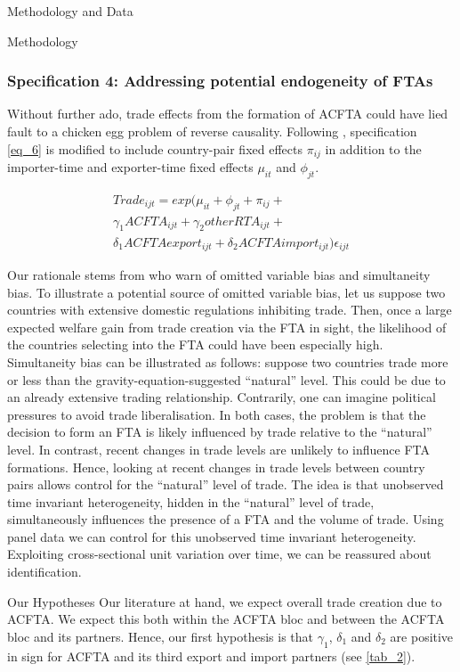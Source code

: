 \begin{section}{Methodology and Data }
\begin{subsection}{Methodology }
\subsubsection*{Specification 4: Addressing potential endogeneity of FTAs}

Without further ado, trade effects from the formation of ACFTA could have lied fault to a chicken egg problem of reverse causality. Following \cite{ypl_2016}, specification \ref{eq_6} is modified to include country-pair fixed effects $\pi_{ij}$ in addition to the importer-time and exporter-time fixed effects $\mu_{it}$ and $\phi_{jt}$.

\begin{multline}\label{eq_7}
Trade_{ijt} = exp \Big(\mu_{it} + \phi_{jt} + \pi_{ij} + \\ 
\gamma_1 ACFTA_{ijt} + \gamma_2 otherRTA_{ijt} +  \\
\delta_1 ACFTAexport_{ijt} + \delta_2 ACFTAimport_{ijt}\Big) \epsilon_{ijt}
\end{multline}

Our rationale stems from \cite{bb_2007} who warn of omitted variable bias and simultaneity bias. 
To illustrate a potential source of omitted variable bias, let us suppose two countries with extensive domestic regulations inhibiting trade. Then, once a large expected welfare gain from trade creation via the FTA in sight, the likelihood of the countries selecting into the FTA could have been especially high. 
Simultaneity bias can be illustrated as follows: suppose two countries trade more or less than the gravity-equation-suggested “natural” level. This could be due to an already extensive trading relationship. Contrarily, one can imagine political pressures to avoid trade liberalisation. In both cases, the problem is that the decision to form an FTA is likely influenced by trade relative to the “natural” level. In contrast, recent changes in trade levels are unlikely to influence FTA formations. Hence, looking at recent changes in trade levels between country pairs allows control for the “natural” level of trade. The idea is that unobserved time invariant heterogeneity, hidden in the “natural” level of trade, simultaneously influences the presence of a FTA and the volume of trade. Using panel data we can control for this unobserved time invariant heterogeneity. Exploiting cross-sectional unit variation over time, we can be reassured about identification. 


\begin{subsubsection}{Our Hypotheses}
Our literature at hand, we expect overall trade creation due to ACFTA. We expect this both within the ACFTA bloc and between the ACFTA bloc and its partners. Hence, our first hypothesis is that $\gamma_1$, $\delta_1$ and $\delta_2$ are positive in sign for ACFTA and its third export and import partners (see \autoref{tab_2}).


\end{subsubsection}
\end{subsection}
\end{section}

